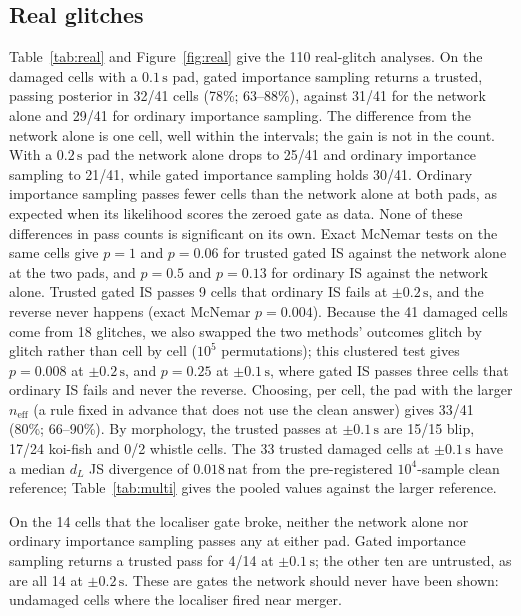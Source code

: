\documentclass{openjournal}
\newcommand{\dL}{d_L}
\newcommand{\neff}{n_{\mathrm{eff}}}
\begin{document}
\subsection{Real glitches}
\label{sec:real}

Table~\ref{tab:real} and Figure~\ref{fig:real} give the 110 real-glitch analyses.
On the damaged cells with a $0.1\,\mathrm{s}$ pad, gated importance sampling returns a trusted, passing posterior in 32/41 cells (78\%; 63--88\%), against 31/41 for the network alone and 29/41 for ordinary importance sampling.
The difference from the network alone is one cell, well within the intervals; the gain is not in the count.
With a $0.2\,\mathrm{s}$ pad the network alone drops to 25/41 and ordinary importance sampling to 21/41, while gated importance sampling holds 30/41.
Ordinary importance sampling passes fewer cells than the network alone at both pads, as expected when its likelihood scores the zeroed gate as data.
None of these differences in pass counts is significant on its own.
Exact McNemar tests on the same cells give $p=1$ and $p=0.06$ for trusted gated IS against the network alone at the two pads, and $p=0.5$ and $p=0.13$ for ordinary IS against the network alone.
Trusted gated IS passes 9 cells that ordinary IS fails at $\pm0.2\,\mathrm{s}$, and the reverse never happens (exact McNemar $p=0.004$). Because the 41 damaged cells come from 18 glitches, we also swapped the two methods' outcomes glitch by glitch rather than cell by cell ($10^{5}$ permutations); this clustered test gives $p=0.008$ at $\pm0.2\,\mathrm{s}$, and $p=0.25$ at $\pm0.1\,\mathrm{s}$, where gated IS passes three cells that ordinary IS fails and never the reverse.
Choosing, per cell, the pad with the larger $\neff$ (a rule fixed in advance that does not use the clean answer) gives 33/41 (80\%; 66--90\%).
By morphology, the trusted passes at $\pm0.1\,\mathrm{s}$ are 15/15 blip, 17/24 koi-fish and 0/2 whistle cells.
The 33 trusted damaged cells at $\pm0.1\,\mathrm{s}$ have a median $\dL$ JS divergence of $0.018\,\mathrm{nat}$ from the pre-registered $10^{4}$-sample clean reference; Table~\ref{tab:multi} gives the pooled values against the larger reference.

On the 14 cells that the localiser gate broke, neither the network alone nor ordinary importance sampling passes any at either pad.
Gated importance sampling returns a trusted pass for 4/14 at $\pm0.1\,\mathrm{s}$; the other ten are untrusted, as are all 14 at $\pm0.2\,\mathrm{s}$.
These are gates the network should never have been shown: undamaged cells where the localiser fired near merger.
\end{document}
